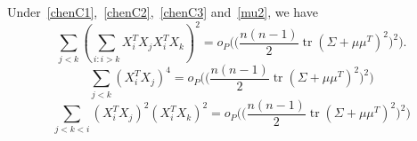 \documentclass[smallcondensed,final,natbib]{svjour3}          %
\DeclareMathOperator{\mytr}{tr}
\begin{document}
\begin{lemma}
    Under~\eqref{chenC1},~\eqref{chenC2},~\eqref{chenC3} and~\eqref{mu2},
we have
    \begin{equation}\label{lemma2R1}
        \sum_{j<k}{(\sum_{i:i>k}X_i^T X_j X_i^T X_k)}^2
        =o_P\Big(\big(\frac{n(n-1)}{2}\mytr (\Sigma+\mu\mu^T)^2\big)^2\Big).
    \end{equation}
    \begin{equation}\label{lemma2R2}
        \sum_{j<k}{(X_i^T X_j)}^4=o_P\Big(\big(\frac{n(n-1)}{2}\mytr (\Sigma+\mu\mu^T)^2\big)^2\Big)
    \end{equation}
    \begin{equation}\label{lemma2R3}
        \sum_{j<k<i}{(X_i^T X_j)}^2{(X_i^T X_k)}^2 =o_P\Big(\big(\frac{n(n-1)}{2}\mytr (\Sigma+\mu\mu^T)^2\big)^2\Big)
    \end{equation}
\end{lemma}
\end{document}
